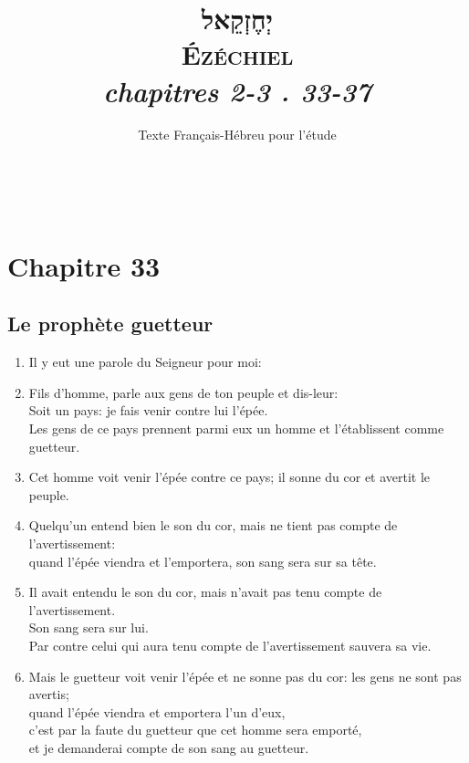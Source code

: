 \documentclass[12pt,a4paper,titlepage]{article}
\title{\vspace{5cm} \fontsize{50}{60}\selectfont \texthebrew{יְחֶזְקֵאל}\\
\fontsize{40}{50}\selectfont \textsc{Ézéchiel} \\
\Large \textit{chapitres 2-3 . 33-37}}
\date{Texte Français-Hébreu pour l'étude}
\def \pslabelsep{0.2em} %
\def \psleftmargin{0em} %
\begin{document}
\maketitle
\vfill

\newpage 


\newpage

\newpage
~\newpage
\noindent
\section*{Chapitre 33}
\subsection*{Le prophète guetteur}
\begin{enumerate}[leftmargin=\psleftmargin, labelsep = \pslabelsep, label={\arabic*}, font=\color{\pscolor}\small\textsuperscript, parsep=0em, itemsep=0em, topsep=0em ]
\item Il y eut une parole du Seigneur pour moi:
\item Fils d’homme, parle aux gens de ton peuple et dis-leur: \\ Soit un pays: je fais venir contre lui l’épée.\\ Les gens de ce pays prennent parmi eux un homme et l’établissent comme guetteur.
\item Cet homme voit venir l’épée contre ce pays; il sonne du cor et avertit le peuple.
\item Quelqu’un entend bien le son du cor, mais ne tient pas compte de l’avertissement: \\ quand l’épée viendra et l’emportera, son sang sera sur sa tête. 
\item Il avait entendu le son du cor, mais n’avait pas tenu compte de l’avertissement. \\ Son sang sera sur lui. \\ Par contre celui qui aura tenu compte de l’avertissement sauvera sa vie. 
\item Mais le guetteur voit venir l’épée et ne sonne pas du cor: les gens ne sont pas avertis; \\ quand l’épée viendra et emportera l’un d’eux, \\ c’est par la faute du guetteur que cet homme sera emporté, 
\\ et je demanderai compte de son sang au guetteur. \parSpace


\end{enumerate}
\end{document}
